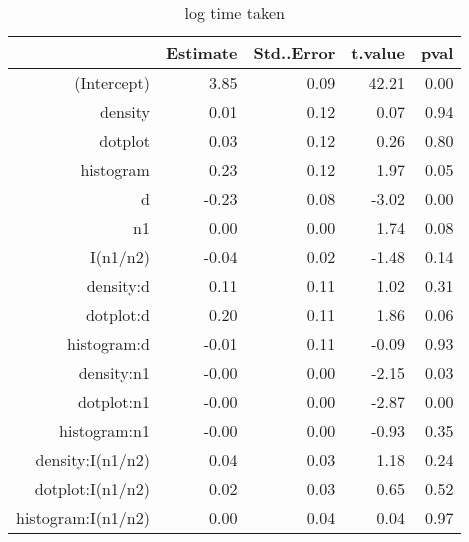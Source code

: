 \begin{table}[ht]
\begin{center}
\begin{tabular}{rrrrr}
  \hline
 & Estimate & Std..Error & t.value & pval \\ 
  \hline
(Intercept) & 3.85 & 0.09 & 42.21 & 0.00 \\ 
  density & 0.01 & 0.12 & 0.07 & 0.94 \\ 
  dotplot & 0.03 & 0.12 & 0.26 & 0.80 \\ 
  histogram & 0.23 & 0.12 & 1.97 & 0.05 \\ 
  d & -0.23 & 0.08 & -3.02 & 0.00 \\ 
  n1 & 0.00 & 0.00 & 1.74 & 0.08 \\ 
  I(n1/n2) & -0.04 & 0.02 & -1.48 & 0.14 \\ 
  density:d & 0.11 & 0.11 & 1.02 & 0.31 \\ 
  dotplot:d & 0.20 & 0.11 & 1.86 & 0.06 \\ 
  histogram:d & -0.01 & 0.11 & -0.09 & 0.93 \\ 
  density:n1 & -0.00 & 0.00 & -2.15 & 0.03 \\ 
  dotplot:n1 & -0.00 & 0.00 & -2.87 & 0.00 \\ 
  histogram:n1 & -0.00 & 0.00 & -0.93 & 0.35 \\ 
  density:I(n1/n2) & 0.04 & 0.03 & 1.18 & 0.24 \\ 
  dotplot:I(n1/n2) & 0.02 & 0.03 & 0.65 & 0.52 \\ 
  histogram:I(n1/n2) & 0.00 & 0.04 & 0.04 & 0.97 \\ 
   \hline
\end{tabular}
\end{center}
\caption{log time taken}

\end{table}



